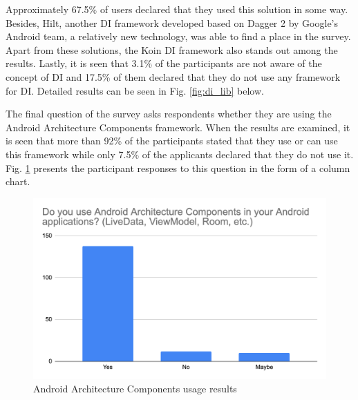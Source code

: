 Approximately 67.5\% of users declared that they used this solution in some way. Besides, Hilt, another DI framework developed based on Dagger 2 by Google's Android team, a relatively new technology, was able to find a place in the survey. Apart from these solutions, the Koin DI framework also stands out among the results. Lastly, it is seen that 3.1\% of the participants are not aware of the concept of DI and 17.5\% of them declared that they do not use any framework for DI. Detailed results can be seen in Fig. \ref{fig:di_lib} below.

The final question of the survey asks respondents whether they are using the Android Architecture Components framework. When the results are examined, it is seen that more than 92\% of the participants stated that they use or can use this framework while only 7.5\% of the applicants declared that they do not use it. Fig. \ref{fig:arch_components} presents the participant responses to this question in the form of a column chart.
\begin{figure}[ht!]
    \centering
    \includegraphics[scale=0.27]{figures/survey_q10_arch_components.png}
    \caption{Android Architecture Components usage results}
    \label{fig:arch_components}
\end{figure}
\FloatBarrier